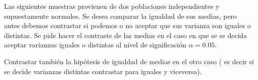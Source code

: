 \documentclass[12pt]{article}\usepackage[]{graphicx}\usepackage[]{color}
\begin{document}
\begin{prob} Las siguientes muestras provienen de dos poblaciones independientes y supuestamente normales.  Se desea comparar la igualdad de sus medias, pero antes debemos contrastar si podemos o no aceptar que sus varianza son iguales o distintas. Se pide hacer el contraste de las medias en el caso en que se se decida aceptar varianzas iguales o distintas al nivel de significación $\alpha=0.05$.





Contrastar también la hipótesis de igualdad de medias en el otro caso ( es decir si se decide varianzas distintas contrastar para iguales y viceversa).


\end{prob}






%
%
%
%
\end{document}
